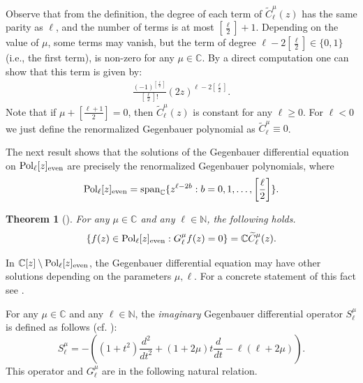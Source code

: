\documentclass[12pt, pdflatex, a4paper]{article}
\theoremstyle{plain}
\newtheorem{thm}{Theorem}[section]
\theoremstyle{definition}
\def\C{{\mathbb C}}
\def\Geg{\widetilde{C}}
\def\N{{\mathbb N}}
\def\Pol{\text{\normalfont{Pol}}}
\def\spanned{\text{\normalfont{span}}}
\begin{document}
Observe that from the definition, the degree of each term of $\Geg_\ell^\mu(z)$ has the same parity as $\ell$, and the number of terms is at most $\left[\frac{\ell}{2}\right]+1$. Depending on the value of $\mu$, some terms may vanish, but the term of degree $\ell - 2\left[\frac{\ell}{2}\right] \in \{0,1\}$ (i.e., the first term), is non-zero for any $\mu \in \C$.
By a direct computation one can show that this term is given by:
\begin{equation*}
\begin{aligned}
\frac{(-1)^{\left[\frac{\ell}{2}\right]}}{\left[\frac{\ell}{2}\right]!} (2z)^{\ell - 2\left[\frac{\ell}{2}\right]}.
\end{aligned}
\end{equation*}
Note that if $\mu + \left[\frac{\ell+1}{2}\right] = 0$, then $\Geg_{\ell}^\mu(z)$ is constant for any $\ell \geq 0$. For $\ell < 0$ we just define the renormalized Gegenbauer polynomial as $\Geg_\ell^\mu \equiv 0$. 

The next result shows that the solutions of the Gegenbauer differential equation on $\Pol_\ell[z]_\text{{\normalfont{even}}}$ are precisely the renormalized Gegenbauer polynomials, where
\begin{equation*}
\Pol_\ell[z]_\text{even} = \spanned_\C\{z^{\ell - 2b}: b = 0, 1, \ldots, \left[\frac{\ell}{2}\right]\}.
\end{equation*}
\begin{thm}[{\cite[Thm 11.4]{KP16b}}]\label{thm-Gegenbauer-solutions} For any $\mu \in \C$ and any $\ell \in \N$, the following holds.
\begin{equation*}
\{f(z) \in \Pol_\ell[z]_\text{{\normalfont{even}}} : G_\ell^\mu f(z) = 0\} = \C \widetilde{C}_\ell^\mu(z).
\end{equation*}
\end{thm}
In $\C[z] \setminus \Pol_\ell[z]_\text{{\normalfont{even}}}$, the Gegenbauer differential equation may have other solutions depending on the parameters $\mu, \ell$. For a concrete statement of this fact see \cite[Thm. 11.4]{KP16b}.

For any $\mu \in \C$ and any $\ell \in \N$, the \textit{imaginary} Gegenbauer differential operator $S_\ell^\mu$ is defined as follows (cf. \cite[(4.7)]{KKP16}):
\begin{equation}\label{Gegen-imaginary}
S_\ell^\mu = - \left((1 + t^2) \frac{d^2}{dt^2} + (1 + 2\mu)t\frac{d}{dt} - \ell(\ell + 2\mu)\right).
\end{equation}
This operator and $G_\ell^\mu$ are in the following natural relation.
\end{document}
